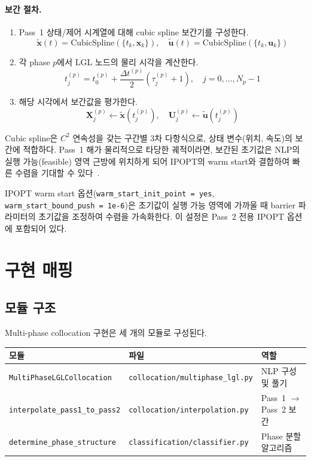 \documentclass[11pt]{article}
\begin{document}
\paragraph{보간 절차.}
\begin{enumerate}
  \item Pass~1 상태/제어 시계열에 대해 cubic spline 보간기를 구성한다.
  \[
  \tilde{\mathbf{x}}(t) = \text{CubicSpline}(\{t_k, \mathbf{x}_k\}), \quad \tilde{\mathbf{u}}(t) = \text{CubicSpline}(\{t_k, \mathbf{u}_k\})
  \]

  \item 각 phase $p$에서 LGL 노드의 물리 시각을 계산한다.
  \[
  t_j^{(p)} = t_0^{(p)} + \frac{\Delta t^{(p)}}{2}(\tau_j^{(p)} + 1), \quad j = 0, \ldots, N_p - 1
  \]

  \item 해당 시각에서 보간값을 평가한다.
  \[
  \mathbf{X}_j^{(p)} \leftarrow \tilde{\mathbf{x}}(t_j^{(p)}), \quad \mathbf{U}_j^{(p)} \leftarrow \tilde{\mathbf{u}}(t_j^{(p)})
  \]
\end{enumerate}

Cubic spline은 $C^2$ 연속성을 갖는 구간별 3차 다항식으로, 상태 변수(위치, 속도)의 보간에 적합하다.
Pass~1 해가 물리적으로 타당한 궤적이라면, 보간된 초기값은 NLP의 실행 가능(feasible) 영역 근방에 위치하게 되어 IPOPT의 warm start와 결합하여 빠른 수렴을 기대할 수 있다~\cite{Wachter2006}.

IPOPT warm start 옵션(\texttt{warm\_start\_init\_point = yes}, \texttt{warm\_start\_bound\_push = 1e-6})은 초기값이 실행 가능 영역에 가까울 때 barrier 파라미터의 초기값을 조정하여 수렴을 가속화한다.
이 설정은 Pass~2 전용 IPOPT 옵션에 포함되어 있다.


\section{구현 매핑}
\label{sec:implementation}

\subsection{모듈 구조}
\label{sec:module_structure}

Multi-phase collocation 구현은 세 개의 모듈로 구성된다.

\begin{table}[htbp]
\centering
\begin{tabular}{lll}
\toprule
모듈 & 파일 & 역할 \\
\midrule
\texttt{MultiPhaseLGLCollocation} & \texttt{collocation/multiphase\_lgl.py} & NLP 구성 및 풀기 \\
\texttt{interpolate\_pass1\_to\_pass2} & \texttt{collocation/interpolation.py} & Pass~1 $\to$ Pass~2 보간 \\
\texttt{determine\_phase\_structure} & \texttt{classification/classifier.py} & Phase 분할 알고리즘 \\
\bottomrule
\end{tabular}
\end{table}
\end{document}

